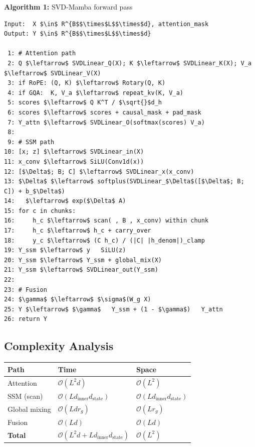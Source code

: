 \textbf{Algorithm 1:} SVD-Mamba forward pass
\begin{lstlisting}
Input:  X $\in$ R^{B$$\times$L$$\times$d}, attention_mask
Output: Y $\in$ R^{B$$\times$L$$\times$d}

 1: # Attention path
 2: Q $\leftarrow$ SVDLinear_Q(X); K $\leftarrow$ SVDLinear_K(X); V_a $\leftarrow$ SVDLinear_V(X)
 3: if RoPE: (Q, K) $\leftarrow$ Rotary(Q, K)
 4: if GQA:  K, V_a $\leftarrow$ repeat_kv(K, V_a)
 5: scores $\leftarrow$ Q K^T / $\sqrt{}$d_h
 6: scores $\leftarrow$ scores + causal_mask + pad_mask
 7: Y_attn $\leftarrow$ SVDLinear_O(softmax(scores) V_a)
 8:
 9: # SSM path
10: [x; z] $\leftarrow$ SVDLinear_in(X)
11: x_conv $\leftarrow$ SiLU(Conv1d(x))
12: [$\Delta$; B; C] $\leftarrow$ SVDLinear_x(x_conv)
13: $\Delta$ $\leftarrow$ softplus(SVDLinear_$\Delta$([$\Delta$; B; C]) + b_$\Delta$)
14:   $\leftarrow$ exp($\Delta$ A)
15: for c in chunks:
16:     h_c $\leftarrow$ scan( , B , x_conv) within chunk
17:     h_c $\leftarrow$ h_c + carry_over
18:     y_c $\leftarrow$ (C h_c) / (|C| |h_denom|)_clamp
19: Y_ssm $\leftarrow$ y   SiLU(z)
20: Y_ssm $\leftarrow$ Y_ssm + global_mix(X)
21: Y_ssm $\leftarrow$ SVDLinear_out(Y_ssm)
22:
23: # Fusion
24: $\gamma$ $\leftarrow$ $\sigma$(W_g X)
25: Y $\leftarrow$ $\gamma$   Y_ssm + (1 - $\gamma$)   Y_attn
26: return Y
\end{lstlisting}

\subsection{Complexity Analysis}

\begin{table}[H]
\centering
\small
\begin{tabular}{lll}
\toprule
\textbf{Path} & \textbf{Time} & \textbf{Space} \\
\midrule
Attention & $\mathcal{O}(L^2 d)$ & $\mathcal{O}(L^2)$ \\
SSM (scan) & $\mathcal{O}(L d_\text{inner} d_\text{state})$ & $\mathcal{O}(L d_\text{inner} d_\text{state})$ \\
Global mixing & $\mathcal{O}(L d r_g)$ & $\mathcal{O}(L r_g)$ \\
Fusion & $\mathcal{O}(L d)$ & $\mathcal{O}(L d)$ \\
\textbf{Total} & $\mathcal{O}(L^2 d + L d_\text{inner} d_\text{state})$ & $\mathcal{O}(L^2)$ \\
\bottomrule
\end{tabular}
\end{table}

